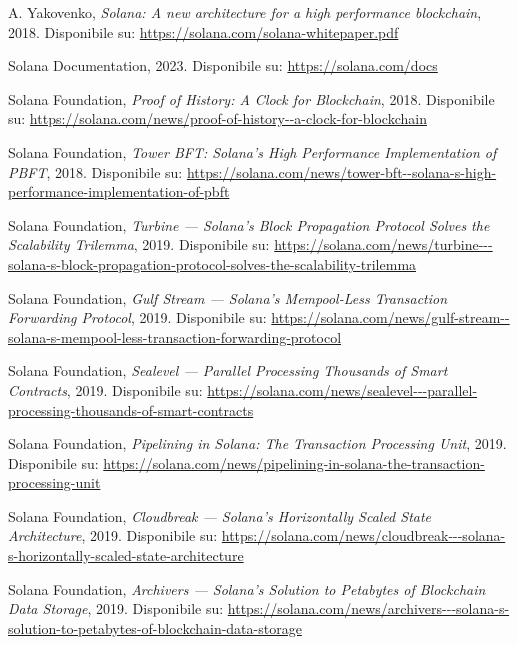 \documentclass[a4paper,12pt]{report}
\begin{document}
	\begin{thebibliography}{99}
		A. Yakovenko, \emph{Solana: A new architecture for a high performance blockchain}, 2018. Disponibile su: \url{https://solana.com/solana-whitepaper.pdf}
		
		Solana Documentation, 2023. Disponibile su:
		\url{https://solana.com/docs}
		
		Solana Foundation, \emph{Proof of History: A Clock for Blockchain}, 2018. Disponibile su:
		\url{https://solana.com/news/proof-of-history--a-clock-for-blockchain}
		
		Solana Foundation, \emph{Tower BFT: Solana’s High Performance Implementation of PBFT}, 2018. Disponibile su:
		\url{https://solana.com/news/tower-bft--solana-s-high-performance-implementation-of-pbft}
		
		Solana Foundation, \emph{Turbine — Solana’s Block Propagation Protocol Solves the Scalability Trilemma}, 2019. Disponibile su:
		\url{https://solana.com/news/turbine---solana-s-block-propagation-protocol-solves-the-scalability-trilemma}
		
		Solana Foundation, \emph{Gulf Stream — Solana’s Mempool-Less Transaction Forwarding Protocol}, 2019. Disponibile su:
		\url{https://solana.com/news/gulf-stream--solana-s-mempool-less-transaction-forwarding-protocol}
		
		Solana Foundation, \emph{Sealevel — Parallel Processing Thousands of Smart Contracts}, 2019. Disponibile su:
		\url{https://solana.com/news/sealevel---parallel-processing-thousands-of-smart-contracts}
		
		Solana Foundation, \emph{Pipelining in Solana: The Transaction Processing Unit}, 2019. Disponibile su:
		\url{https://solana.com/news/pipelining-in-solana-the-transaction-processing-unit}
		
		Solana Foundation, \emph{Cloudbreak — Solana’s Horizontally Scaled State Architecture}, 2019. Disponibile su:
		\url{https://solana.com/news/cloudbreak---solana-s-horizontally-scaled-state-architecture}
		
		Solana Foundation, \emph{Archivers — Solana’s Solution to Petabytes of Blockchain Data Storage}, 2019. Disponibile su:
		\url{https://solana.com/news/archivers---solana-s-solution-to-petabytes-of-blockchain-data-storage}
		

\end{thebibliography}
\end{document}
